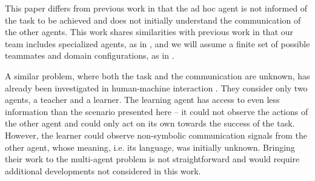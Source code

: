 This paper differs from previous work in that the ad hoc agent is not informed of the task to be achieved and does not initially understand the communication of the other agents. This work shares similarities with previous work in that our team includes specialized agents, as in \cite{genter2011role}, and we will assume a finite set of possible teammates and domain configurations, as in \cite{genter2011role,barrett2011empirical,barrett2014communicating}.


A similar problem, where both the task and the communication are unknown, has already been investigated in human-machine interaction \cite{grizou2014interactive}. They consider only two agents, a teacher and a learner. The learning agent has access to even less information than the scenario presented here -- it could not observe the actions of the other agent and could only act on its own towards the success of the task. However, the learner could observe non-symbolic communication signals from the other agent, whose meaning, i.e. its language, was initially unknown. Bringing their work to the multi-agent problem is not straightforward and would require additional developments not considered in this work.



